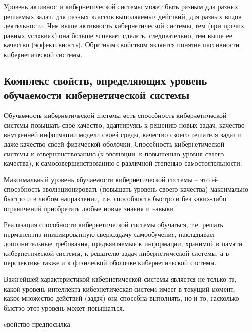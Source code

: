 Уровень активности кибернетической системы может быть разным для разных решаемых задач, для разных классов выполняемых действий, для разных видов деятельности. 
Чем выше активность кибернетической системы, тем (при прочих равных условиях) она больше успевает сделать, следовательно, тем выше ее качество (эффективность).
Обратным свойством является понятие пассивности кибернетической системы. 


\subsection{Комплекс свойств, определяющих уровень обучаемости кибернетической системы}

Обучаемость кибернетической системы есть способность кибернетической системы повышать своё качество, адаптируясь к решению новых задач, качество внутренней информации модели своей среды, качество своего решателя задач и даже качество своей физической оболочки. 
Способность кибернетической системы к совершенствованию (к эволюции, к повышению уровня своего качества), к самосовершенствованию с различной степенью самостоятельности.

Максимальный уровень обучаемости кибернетической системы – это её способность эволюционировать (повышать уровень своего качества) максимально быстро и в любом направлении, т.е. способность быстро и без каких-либо ограничений приобретать любые новые знания и навыки.

Реализация способности кибернетической системы обучаться, т.е. решать перманентно инициированную сверхзадачу самообучения, накладывает дополнительные требования, предъявляемые к информации, хранимой в памяти кибернетической системы, к решателю задач кибернетической системы, а в перспективе также и к физической оболочке кибернетической системы.

Важнейшей характеристикой кибернетической системы является не только то, какой уровень интеллекта кибернетическая система имеет в текущий момент, какое множество действий (задач) она способна выполнять, но и то, насколько быстро этот уровень может повышаться.

\begin{SCn}
\begin{scnrelfromlist}{cвойство-предпосылка}
\end{scnrelfromlist}
\end{SCn}

